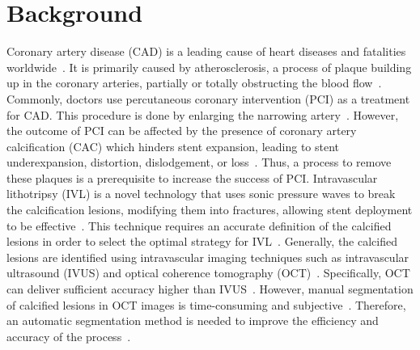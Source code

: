 \documentclass[a4paper,11pt,oneside]{report}
\begin{document}
\chapter{Background}


Coronary artery disease (CAD) is a leading cause of heart diseases and fatalities worldwide~\cite{Ralapanawa2021, Virani2021Heart, Wu2015}. It is primarily caused by atherosclerosis, a process of plaque building up in the coronary arteries, partially or totally obstructing the blood flow~\cite{Shahjehan2023}. Commonly, doctors use percutaneous coronary intervention (PCI) as a treatment for CAD. This procedure is done by enlarging the narrowing artery~\cite{Ahmad2023}. However, the outcome of PCI can be affected by the presence of coronary artery calcification (CAC) which hinders stent expansion, leading to stent underexpansion, distortion, dislodgement, or loss~\cite{Hennessey2023}. Thus, a process to remove these plaques is a prerequisite to increase the success of PCI. Intravascular lithotripsy (IVL) is a novel technology that uses sonic pressure waves to break the calcification lesions, modifying them into fractures, allowing stent deployment to be effective~\cite{Butt2023}. This technique requires an accurate definition of the calcified lesions in order to select the optimal strategy for IVL~\cite{Butt2023}. Generally, the calcified lesions are identified using intravascular imaging techniques such as intravascular ultrasound (IVUS) and optical coherence tomography (OCT)~\cite{Butt2023}. Specifically, OCT can deliver sufficient accuracy higher than IVUS~\cite{Fujimoto2003, Costopoulos2016}. However, manual segmentation of calcified lesions in OCT images is time-consuming and subjective~\cite{Segars2013, Oktay2020, Carpenter2022}. Therefore, an automatic segmentation method is needed to improve the efficiency and accuracy of the process~\cite{Carpenter2022}. 
\end{document}
